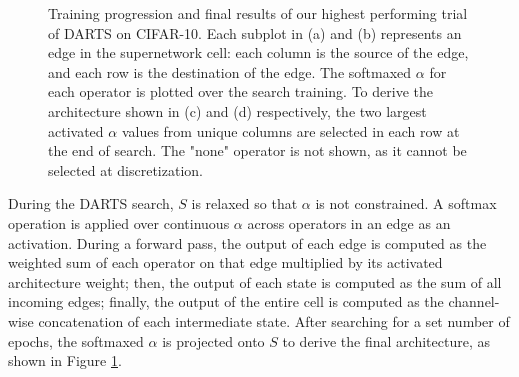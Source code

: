 \documentclass[letterpaper]{article} \usepackage{aaai22}  \usepackage{times}  \usepackage{helvet}  \usepackage{courier}  \usepackage[hyphens]{url}  \usepackage{graphicx} \urlstyle{rm} \def\UrlFont{\rm}  \usepackage{natbib}  \usepackage{caption} \DeclareCaptionStyle{ruled}{labelfont=normalfont,labelsep=colon,strut=off} \frenchspacing  \setlength{\pdfpagewidth}{8.5in}  \setlength{\pdfpageheight}{11in}  \usepackage{algorithm}
\begin{document}
\begin{figure}[ht!]
\begin{minipage}{.9\linewidth}
\centering
{} \end{minipage}\par
\begin{minipage}{.9\linewidth}
\centering
{}
\end{minipage}\par
\begin{minipage}{.395\linewidth}
\centering
{}
 \end{minipage}
\begin{minipage}{.595\linewidth}
\centering
{}
 \end{minipage}\small
\caption{Training progression and final results of our highest performing trial of DARTS on CIFAR-10. Each subplot in (a) and (b) represents an edge in the supernetwork cell: each column is the source of the edge, and each row is the destination of the edge. The softmaxed $\alpha$ for each operator is plotted over the search training. To derive the architecture shown in (c) and (d) respectively, the two largest activated $\alpha$ values from unique columns are selected in each row at the end of search. The "none" operator is not shown, as it cannot be selected at discretization.}
\label{fig:darts}
\end{figure}

During the DARTS search, $S$ is relaxed so that $\alpha$ is not constrained. A softmax operation is applied over continuous $\alpha$ across operators in an edge as an activation. During a forward pass, the output of each edge is computed as the weighted sum of each operator on that edge multiplied by its activated architecture weight; then, the output of each state is computed as the sum of all incoming edges; finally, the output of the entire cell is computed as the channel-wise concatenation of each intermediate state. After searching for a set number of epochs, the softmaxed $\alpha$ is projected onto $S$ to derive the final architecture, as shown in Figure \ref{fig:darts}.
\end{document}

